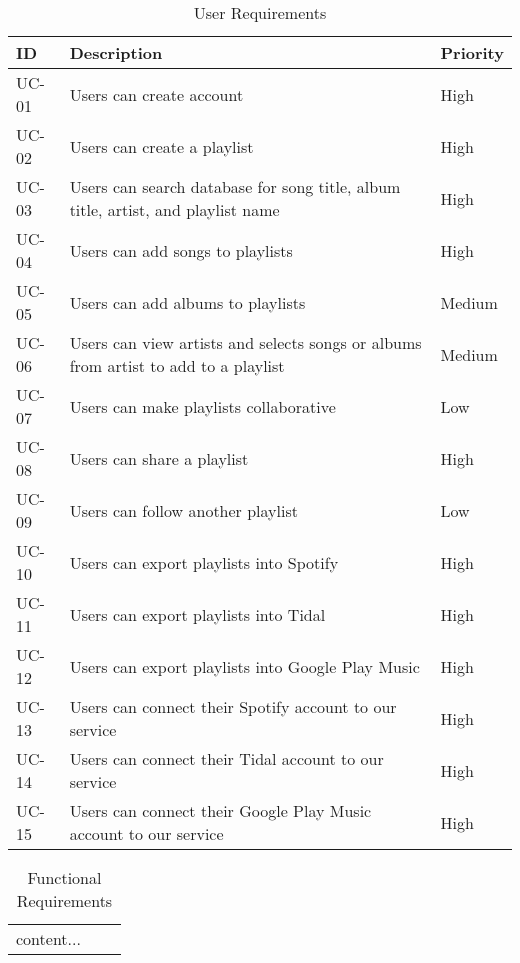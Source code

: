 \documentclass[12pt]{article}
\begin{document}
	\begin{table*}
		\centering
		\label{tab:ur}
		\caption*{User Requirements}
		\begin{tabularx}{450pt}{lXl}
			ID & Description & Priority\\\hline
			UC-01 & Users can create account & High \\
			UC-02 & Users can create a playlist & High \\
			UC-03 & Users can search database for song title, album title,
			artist, and playlist name & High \\
			UC-04 & Users can add songs to playlists & High \\
			UC-05 & Users can add albums to playlists & Medium \\
			UC-06 & Users can view artists and selects songs or albums from artist to add to a playlist & Medium \\
			UC-07 & Users can make playlists collaborative & Low \\
			UC-08 & Users can share a playlist & High \\
			UC-09 & Users can follow another playlist & Low\\
			UC-10 & Users can export playlists into Spotify & High \\
			UC-11 & Users can export playlists into Tidal & High \\
			UC-12 & Users can export playlists into Google Play Music & High \\
			UC-13 & Users can connect their Spotify account to our service & High \\
			UC-14 & Users can connect their Tidal account to our service & High \\
			UC-15 & Users can connect their Google Play Music account to our service & High \\
		\end{tabularx}
	\end{table*}
	\begin{table*}
		\centering
		\label{tab:fr}
		\caption*{Functional Requirements}
		\begin{tabularx}{450pt}{lXl}
			content...
		\end{tabularx}
	\end{table*}
\end{document}
